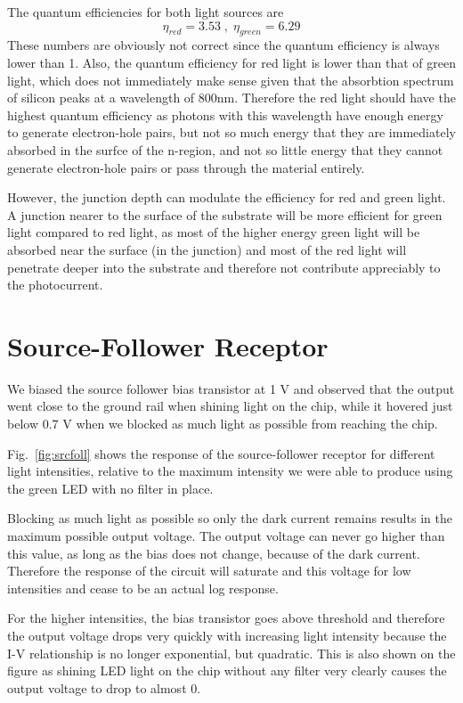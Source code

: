 The quantum efficiencies for both light sources are
\begin{equation*}
    \eta_{red} = 3.53 \; , \; \eta_{green} = 6.29
\end{equation*}
These numbers are obviously not correct since the quantum efficiency is always lower than 1. Also, the quantum efficiency for red light
is lower than that of green light, which does not immediately make sense given that the absorbtion spectrum of silicon peaks at a wavelength of 800nm.
Therefore the red light should have the highest quantum efficiency as photons with this wavelength have enough energy to generate electron-hole
pairs, but not so much energy that they are immediately absorbed in the surfce of the n-region, and not so little energy that they cannot 
generate electron-hole pairs or pass through the material entirely.

However, the junction depth can modulate the efficiency for red and green light. A junction nearer to the surface of the substrate will be more
efficient for green light compared to red light, as most of the higher energy green light will be absorbed near the surface (in the junction) and
most of the red light will penetrate deeper into the substrate and therefore not contribute appreciably to the photocurrent.

\section{Source-Follower Receptor}
We biased the source follower bias transistor at 1 V and observed that the output went close to the ground rail when shining light on the chip,
while it hovered just below 0.7 V when we blocked as much light as possible from reaching the chip.

Fig.~\ref{fig:srcfoll} shows the response of the source-follower receptor for different light intensities, relative to the maximum intensity
we were able to produce using the green LED with no filter in place.

Blocking as much light as possible so only the dark current remains results in the maximum possible output voltage. The output voltage can never
go higher than this value, as long as the bias does not change, because of the dark current. Therefore the response of the circuit will saturate
and this voltage for low intensities and cease to be an actual log response.

For the higher intensities, the bias transistor goes above threshold and therefore the output voltage drops very quickly with increasing light intensity
because the I-V relationship is no longer exponential, but quadratic. This is also shown on the figure as shining LED light on the chip without any filter
very clearly causes the output voltage to drop to almost 0.



